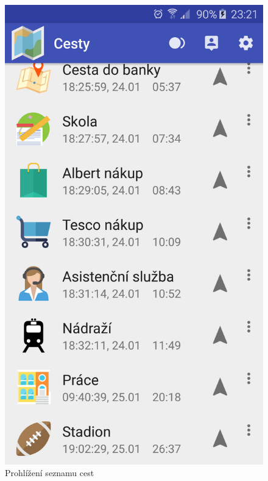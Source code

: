 \documentclass[czech,master,public,dept460,male,java,cpdeclaration]{diploma}
\begin{document}
\begin{figure}[H]
\begin{minipage}{.5\textwidth}
\centering
                \includegraphics[scale=0.14]{img/screen/seznamcest.png}
        \caption{Prohlížení seznamu cest}
        \label{fig:prohlizeniasistent}
\end{minipage}
\begin{minipage}{.5\textwidth}
    \centering

\end{minipage}
\end{figure}
\end{document}
